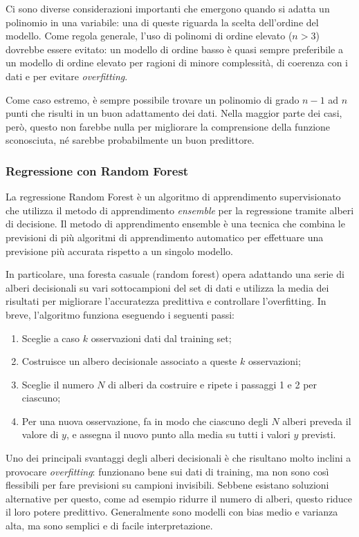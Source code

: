 Ci sono diverse considerazioni importanti che emergono quando si adatta un polinomio in una variabile: una di queste riguarda la scelta dell'ordine del modello.
Come regola generale, l'uso di polinomi di ordine elevato ($n > 3$) dovrebbe essere evitato: un modello di ordine basso è quasi sempre preferibile a un modello di ordine elevato per ragioni di minore complessità, di coerenza con i dati e per evitare \textit{overfitting}.

Come caso estremo, è sempre possibile trovare un polinomio di grado $n-1$ ad $n$ punti che risulti in un buon adattamento dei dati.
Nella maggior parte dei casi, però, questo non farebbe nulla per migliorare la comprensione della funzione sconosciuta, né sarebbe probabilmente un buon predittore.

\subsubsection{Regressione con Random Forest}\label{sssec:regressione-rf}
La regressione Random Forest è un algoritmo di apprendimento supervisionato che utilizza il metodo di apprendimento \textit{ensemble} per la regressione tramite alberi di decisione. Il metodo di apprendimento ensemble è una tecnica che combina le previsioni di più algoritmi di apprendimento automatico per effettuare una previsione più accurata rispetto a un singolo modello. \cite{random_forest}

In particolare, una foresta casuale (random forest) opera adattando una serie di alberi decisionali su vari sottocampioni del set di dati e utilizza la media dei risultati per migliorare l'accuratezza predittiva e controllare l'overfitting.
In breve, l'algoritmo funziona eseguendo i seguenti passi:

\begin{enumerate}
  \item Sceglie a caso $k$ osservazioni dati dal training set;
  \item Costruisce un albero decisionale associato a queste $k$ osservazioni;
  \item Sceglie il numero $N$ di alberi da costruire e ripete i passaggi 1 e 2 per ciascuno;
  \item Per una nuova osservazione, fa in modo che ciascuno degli $N$ alberi preveda il valore di $y$, e assegna il nuovo punto alla media su tutti i valori $y$ previsti.
\end{enumerate}

Uno dei principali svantaggi degli alberi decisionali è che risultano molto inclini a provocare \textit{overfitting}: funzionano bene sui dati di training, ma non sono così flessibili per fare previsioni su campioni invisibili. Sebbene esistano soluzioni alternative per questo, come ad esempio ridurre il numero di alberi, questo riduce il loro potere predittivo. Generalmente sono modelli con bias medio e varianza alta, ma sono semplici e di facile interpretazione.

